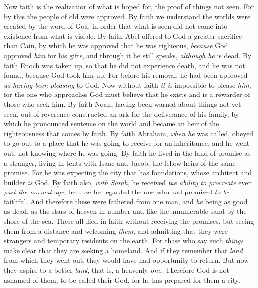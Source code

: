 \begin{biblechapter} %
 Now faith is the realization of what is hoped for, the proof of things not seen.
\verse For by this the people of old were approved.
\verse By faith we understand the worlds were created by the word of God, in order that what is seen did not come into existence from what is visible.
\verse By faith Abel offered to God a greater sacrifice than Cain, by which he was approved that he was righteous, \textit{because} God approved \textit{him} for his gifts, and through it he still speaks, \textit{although he} is dead.
\verse By faith Enoch was taken up, so that he did not experience death, and he was not found, because God took him up. For before his removal, he had been approved \textit{as having been pleasing} to God.
\verse Now without faith \textit{it is} impossible to please \textit{him}, for the one who approaches God must believe that he exists and is a rewarder of those who seek him.
\verse By faith Noah, having been warned about things not yet seen, out of reverence constructed an ark for the deliverance of his family, by which he pronounced sentence on the world and became an heir of the righteousness that comes by faith.
\verse By faith Abraham, \textit{when he} was called, obeyed to go out to a place that he was going to receive for an inheritance, and he went out, not knowing where he was going.
\verse By faith he lived in the land of promise as a stranger, living in tents with Isaac and Jacob, the fellow heirs of the same promise.
\verse For he was expecting the city that has foundations, whose architect and builder \textit{is} God.
\verse By faith also, \textit{with Sarah}, he received \textit{the ability to procreate} even \textit{past the normal age}, because he regarded the one who had promised \textit{to be} faithful.
\verse And therefore these were fathered from one man, and \textit{he} being as good as dead, as the stars of heaven in number and like the innumerable sand by the shore of the sea.
\verse These all died in faith without receiving the promises, but seeing them from a distance and welcoming \textit{them}, and admitting that they were strangers and temporary residents on the earth.
\verse For those who say such \textit{things} make clear that they are seeking a homeland.
\verse And if they remember that \textit{land} from which they went out, they would have had opportunity to return.
\verse But now they aspire to a better \textit{land}, that is, a heavenly \textit{one}. Therefore God is not ashamed of them, to be called their God, for he has prepared for them a city.

\end{biblechapter}
